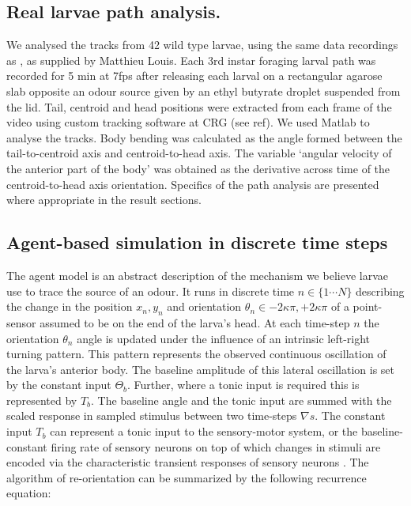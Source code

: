 \documentclass[11pt,a4paper]{article}
\begin{document}
\subsection{Real larvae path analysis.}
We analysed the tracks from 42 wild type larvae, using the same data recordings as \cite{gomez2011active}, as supplied by Matthieu Louis. Each 3rd instar foraging larval path was recorded for 5 min at 7fps after releasing each larval on a rectangular agarose slab opposite an odour source given by an ethyl butyrate droplet suspended from the lid. Tail, centroid and head positions were extracted from each frame of the video using custom tracking software at CRG (see ref). We used Matlab to analyse the tracks. Body bending was calculated as the angle formed between the tail-to-centroid axis and centroid-to-head axis. The variable ‘angular velocity of the anterior part of the body’ was obtained as the derivative across time of the centroid-to-head axis orientation. Specifics of the path analysis are presented where appropriate in the result sections. 

\subsection{Agent-based simulation in discrete time steps}
\label{sec:methodsDiscreteAgent}
The agent model is an abstract description of the mechanism we believe larvae use to trace the source of an odour. It runs in discrete time $n \in \{1 \cdots N\}$ describing the change in the position $x_n,y_n$ and orientation $\theta_n \in {-2 \kappa \pi,+2 \kappa \pi}$ of a point-sensor assumed to be on the end of the larva's head. At each time-step $n$ the orientation $\theta_n$ angle is updated under the influence of an intrinsic left-right turning pattern. This pattern represents the observed continuous oscillation of the larva's anterior body. The baseline amplitude of this lateral oscillation is set by the constant input $\Theta_b$. Further, where a tonic input is required this is represented by $T_b$. The baseline angle and the tonic input are summed with the scaled response in sampled stimulus between two time-steps $\nabla s$. The constant input $T_b$ can represent a tonic input to the sensory-motor system, or the baseline- constant firing rate of sensory neurons on top of which changes in stimuli are encoded via the characteristic transient responses of sensory neurons \citep{nagel2011biophysical}.
The algorithm of re-orientation can be summarized by the following recurrence equation:
\end{document}
